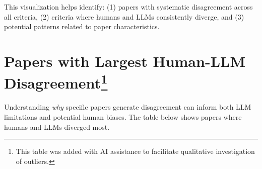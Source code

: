 \documentclass[
  11pt,
  letterpaper,
  DIV=11,
  numbers=noendperiod]{scrreprt}
\begin{document}
This visualization helps identify: (1) papers with systematic
disagreement across all criteria, (2) criteria where humans and LLMs
consistently diverge, and (3) potential patterns related to paper
characteristics.

\section[Papers with Largest Human-LLM
Disagreement]{\texorpdfstring{Papers with Largest Human-LLM
Disagreement\footnote{This table was added with AI assistance to
  facilitate qualitative investigation of outliers.}}{Papers with Largest Human-LLM Disagreement}}\label{papers-with-largest-human-llm-disagreementresults_ratings-8}

Understanding \emph{why} specific papers generate disagreement can
inform both LLM limitations and potential human biases. The table below
shows papers where humans and LLMs diverged most.
\end{document}
